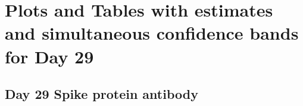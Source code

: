 \documentclass[]{book}
\theoremstyle{definition}
\theoremstyle{definition}
\theoremstyle{definition}
\newcommand{\1}{\mathbbm{1}}
\begin{document}
\clearpage

\clearpage

\hypertarget{plots-and-tables-with-estimates-and-simultaneous-confidence-bands-for-day-29}{%
\section{Plots and Tables with estimates and simultaneous confidence bands for Day 29}\label{plots-and-tables-with-estimates-and-simultaneous-confidence-bands-for-day-29}}

\clearpage

\hypertarget{day-29-spike-protein-antibody-2}{%
\subsection{Day 29 Spike protein antibody}\label{day-29-spike-protein-antibody-2}}
\end{document}
